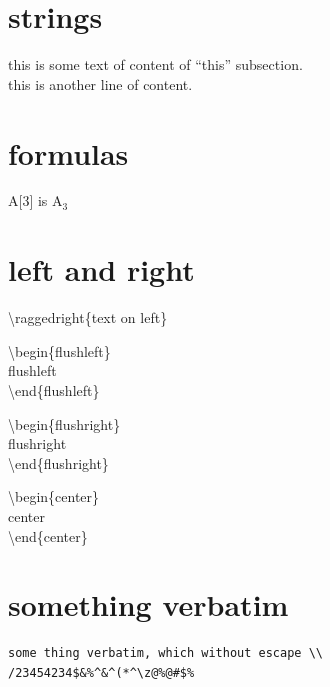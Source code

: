 \documentclass[11pt,a4paper]{article}
\begin{document}
\section{strings}{
  this is some text of content of ``this'' subsection.\\
  this is another line of content.
}

\section{formulas}{
  \begin{center}
    A[3] is $\mathrm{A}_3$
  \end{center}
}


\section{left and right}{
  \raggedright{\textbackslash{}raggedright\{text on left\}}
  \begin{flushleft}
    \textbackslash{}begin\{flushleft\}\\
    flushleft\\
    \textbackslash{}end\{flushleft\}
  \end{flushleft}
  \begin{flushright}
    \textbackslash{}begin\{flushright\}\\
    flushright\\
    \textbackslash{}end\{flushright\}
  \end{flushright}
  \begin{center}
    \textbackslash{}begin\{center\}\\
    center\\
    \textbackslash{}end\{center\}
  \end{center}
}

\section{something verbatim}{
\begin{verbatim}
some thing verbatim, which without escape \\ /23454234$&%^&^(*^\z@%@#$%
\end{verbatim}
}
\end{document}
